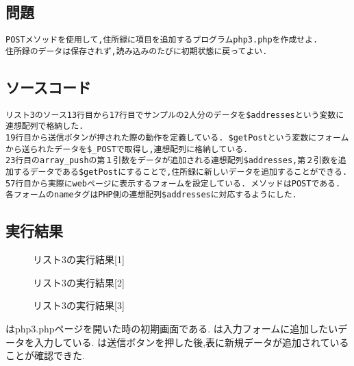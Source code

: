 \documentclass[a4j,10pt]{jsarticle}
\begin{document}
\subsection{問題}

\begin{verbatim}
POSTメソッドを使用して,住所録に項目を追加するプログラムphp3.phpを作成せよ.
住所録のデータは保存されず,読み込みのたびに初期状態に戻ってよい.
\end{verbatim}
\subsection{ソースコード}


\begin{verbatim}
リスト3のソース13行目から17行目でサンプルの2人分のデータを$addressesという変数に連想配列で格納した.
19行目から送信ボタンが押された際の動作を定義している. $getPostという変数にフォームから送られたデータを$_POSTで取得し,連想配列に格納している.
23行目のarray_pushの第１引数をデータが追加される連想配列$addresses,第２引数を追加するデータである$getPostにすることで,住所録に新しいデータを追加することができる.
57行目から実際にwebページに表示するフォームを設定している. メソッドはPOSTである.
各フォームのnameタグはPHP側の連想配列$addressesに対応するようにした.

\end{verbatim}
\subsection{実行結果}

\begin{figure}[H]
  \centering
  \caption{リスト3の実行結果[1]}
\label{fig:fig3}
\end{figure}

\begin{figure}[H]
  \centering
  \caption{リスト3の実行結果[2]}
\label{fig:fig4}
\end{figure}

\begin{figure}[H]
  \centering
  \caption{リスト3の実行結果[3]}
\label{fig:fig5}
\end{figure}

はphp3.phpページを開いた時の初期画面である.
は入力フォームに追加したいデータを入力している.
は送信ボタンを押した後,表に新規データが追加されていることが確認できた.
\end{document}
